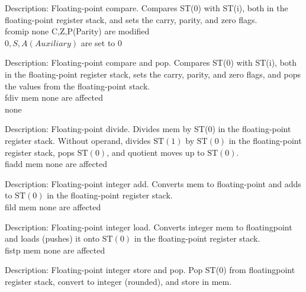 \documentclass[10pt]{article}
\begin{document}
Description: Floating-point compare. Compares ST(0) with ST(i), both in the floating-point register stack, and sets the carry, parity, and zero flags.\\
fcomip none C,Z,P(Parity) are modified\\
$0, S, A(A u x i l i a r y)$ are set to 0

Description: Floating-point compare and pop. Compares ST(0) with ST(i), both in the floating-point register stack, sets the carry, parity, and zero flags, and pops the values from the floating-point stack.\\
fdiv mem none are affected\\
none

Description: Floating-point divide. Divides mem by ST(0) in the floating-point register stack. Without operand, divides $\mathrm{ST}(1)$ by $\mathrm{ST}(0)$ in the floating-point register stack, pops $\mathrm{ST}(0)$, and quotient moves up to $\mathrm{ST}(0)$.\\
fiadd mem none are affected

Description: Floating-point integer add. Converts mem to floating-point and adds to $\mathrm{ST}(0)$ in the floating-point register stack.\\
fild mem none are affected

Description: Floating-point integer load. Converts integer mem to floatingpoint and loads (pushes) it onto $\mathrm{ST}(0)$ in the floating-point register stack.\\
fistp mem none are affected

Description: Floating-point integer store and pop. Pop ST(0) from floatingpoint register stack, convert to integer (rounded), and store in mem.
\end{document}
